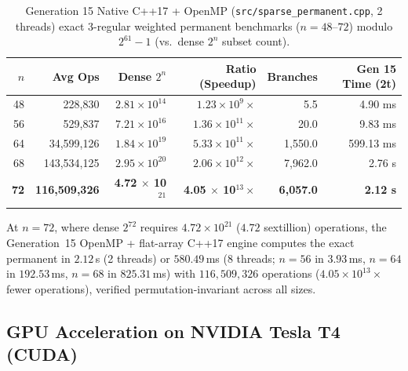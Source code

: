 \documentclass[11pt,a4paper]{article}
\theoremstyle{definition}
\begin{document}
\begin{table}[!htbp]
\centering
\caption{Generation 15 Native C++17 + OpenMP (\texttt{src/sparse\_permanent.cpp}, 2 threads) exact 3-regular weighted permanent benchmarks ($n = 48\text{--}72$) modulo $2^{61}-1$ (vs.\ dense $2^n$ subset count).}
\label{tab:cpp_sparse_bench}
\begin{tabular*}{\linewidth}{@{\extracolsep{\fill}}rrrrrr}
\toprule
$n$ & Avg Ops & Dense $2^n$ & Ratio (Speedup) & Branches & Gen 15 Time (2t) \\
\midrule
48 & 228,830     & $2.81 \times 10^{14}$ & $1.23 \times 10^9\times$     & 5.5     & 4.90 ms \\
56 & 529,837     & $7.21 \times 10^{16}$ & $1.36 \times 10^{11}\times$  & 20.0    & 9.83 ms \\
64 & 34,599,126  & $1.84 \times 10^{19}$ & $5.33 \times 10^{11}\times$  & 1,550.0 & 599.13 ms \\
68 & 143,534,125 & $2.95 \times 10^{20}$ & $2.06 \times 10^{12}\times$  & 7,962.0 & 2.76 s \\
\textbf{72} & \textbf{116,509,326} & \textbf{4.72 $\times$ 10$^{21}$} & \textbf{4.05 $\times$ 10$^{13}\times$} & \textbf{6,057.0} & \textbf{2.12 s} \\
\bottomrule
\end{tabular*}
\end{table}

At $n = 72$, where dense $2^{72}$ requires $4.72 \times 10^{21}$ ($4.72$ sextillion) operations, the Generation~15 OpenMP + flat-array C++17 engine computes the exact permanent in $2.12$\,s (2 threads) or $580.49$\,ms (8 threads; $n=56$ in $3.93$\,ms, $n=64$ in $192.53$\,ms, $n=68$ in $825.31$\,ms) with $116{,}509{,}326$ operations ($4.05 \times 10^{13}\times$ fewer operations), verified permutation-invariant across all sizes.

\subsection{GPU Acceleration on NVIDIA Tesla T4 (CUDA)}
\end{document}
